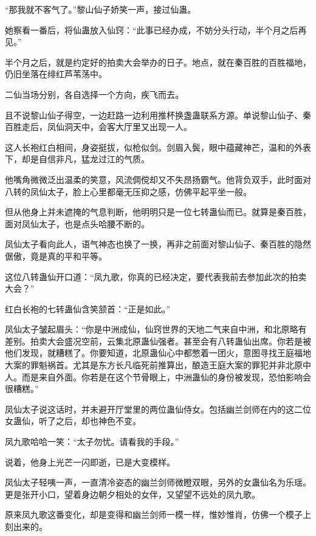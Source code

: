 
\begin{this_body}



“那我就不客气了。”黎山仙子娇笑一声，接过仙蛊。

她察看一番后，将仙蛊放入仙窍：“此事已经办成，不妨分头行动，半个月之后再见。”

半个月之后，就是约定好的拍卖大会举办的日子。地点，就在秦百胜的百胜福地，仍旧坐落在绯红芦苇荡中。

二仙当场分别，各自选择一个方向，疾飞而去。

且不说黎山仙子得空，一边赶路一边利用推杯换盏蛊联系方源。单说黎山仙子、秦百胜走后，凤仙洞天中，会客大厅里又出现一人。

这人长袍红白相间，身姿挺拔，似枪似剑。剑眉入鬓，眼中蕴藏神芒，温和的外表下，却是自信非凡，猛龙过江的气质。

他嘴角微微泛出温柔的笑意，风流倜傥却又不失昂扬霸气。他背负双手，此时面对八转的凤仙太子，脸上心里都毫无压抑之感，仿佛平起平坐一般。

但从他身上并未遮掩的气息判断，他明明只是一位七转蛊仙而已。就算是秦百胜，面对凤仙太子，也是点头哈腰不断的。

凤仙太子看向此人，语气神态也换了一换，再非之前面对黎山仙子、秦百胜的隐然倨傲，竟是真的平和平等。

这位八转蛊仙开口道：“凤九歌，你真的已经决定，要代表我前去参加此次的拍卖大会？”

红白长袍的七转蛊仙含笑颔首：“正是如此。”

凤仙太子皱起眉头：“你是中洲成仙，仙窍世界的天地二气来自中洲，和北原略有差别。拍卖大会盛况空前，云集北原蛊仙强者。甚至会有八转蛊仙出席。你若是被他们发现，就糟糕了。你要知道，北原蛊仙心中都憋着一团火，意图寻找王庭福地大案的罪魁祸首。尤其是东方长凡临死前推算出，酿造王庭大案的罪犯并非北原中人。而是来自外面。你若是在这个节骨眼上，中洲蛊仙的身份被发现，恐怕影响会很糟糕。”

凤仙太子说这话时，并未避开厅堂里的两位蛊仙侍女。包括幽兰剑师在内的这二位女蛊仙，听了之后，却也神色不变。

凤九歌哈哈一笑：“太子勿忧。请看我的手段。”

说着，他身上光芒一闪即逝，已是大变模样。

凤仙太子轻咦一声，一直清冷姿态的幽兰剑师微瞪双眼，另外的女蛊仙名为乐瑶。更是张开小口，望着身边朝夕相处的女伴，又望望不远处的凤九歌。

原来凤九歌这番变化，却是变得和幽兰剑师一模一样，惟妙惟肖，仿佛一个模子上刻出来的。


\end{this_body}
